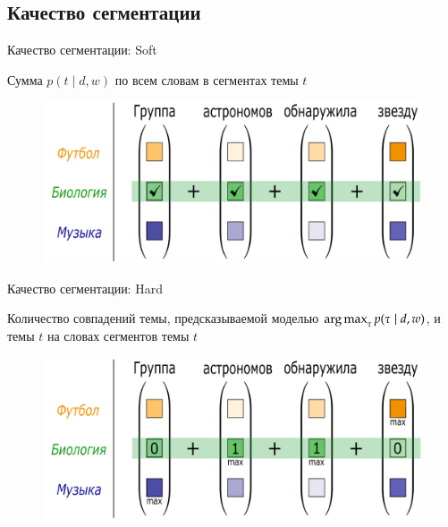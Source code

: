 \documentclass[sans, mathsans, russian]{beamer}
\begin{document}
	
\subsection{Качество сегментации}


\begin{frame}{Качество сегментации: Soft}
  \begin{block}{}
    Сумма $p(t \mid d, w)$ по всем словам в сегментах темы $t$
  \end{block}
  
  \vspace{1.2em}
  
  \begin{figure}[h]
    \centering
    \includegraphics[width=1.0\textwidth, height=0.45\textheight]{astronomers_soft.eps} %
  \end{figure}
\end{frame}


\begin{frame}{Качество сегментации: Hard}
  \begin{block}{}
    Количество совпадений темы, предсказываемой моделью $\operatorname*{arg\,max}_\tau p(\tau \mid d, w)$, и темы $t$ на словах сегментов темы $t$
  \end{block}
  
  \begin{figure}[h]
    \centering
    \includegraphics[width=1.0\textwidth, height=0.45\textheight]{astronomers_strict.eps} %
  \end{figure}
\end{frame}
\end{document}
